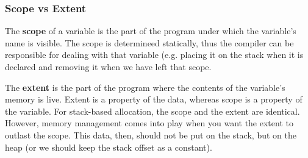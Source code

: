 \documentclass[12pt]{article}
\begin{document}
\subsubsection*{Scope vs Extent}
The {\bf scope} of a variable is the part of the program under which the variable's name is visible. The scope is determineed statically, thus the compiler can be responsible for dealing with that variable (e.g. placing it on the stack when it is declared and removing it when we have left that scope.

The {\bf extent} is the part of the program where the contents of the variable's memory is live. Extent is a property of the data, whereas scope is a property of the variable. For stack-based allocation, the scope and the extent are identical. However, memory management comes into play when you want the extent to outlast the scope. This data, then, should not be put on the stack, but on the heap (or we should keep the stack offset as a constant).
\end{document}
